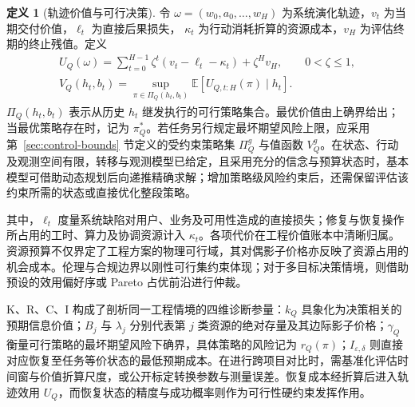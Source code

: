 \documentclass[11pt,a4paper]{ctexart}
\numberwithin{equation}{section}
\theoremstyle{definition}
\newtheorem{definition}{定义}[section]
\theoremstyle{plain}
\begin{document}
\begin{definition}[轨迹价值与可行决策]
令 $\omega=(w_0,a_0,\ldots,w_H)$ 为系统演化轨迹，$v_t$ 为当期交付价值，$\ell_t$ 为直接后果损失，
$\kappa_t$ 为行动消耗折算的资源成本，$v_H$ 为评估终期的终止残值。定义
\begin{align}
U_Q(\omega)=\sum_{t=0}^{H-1}\zeta^t(v_t-\ell_t-\kappa_t)+\zeta^H v_H,
\qquad 0<\zeta\le1, \label{eq:trajectory-value}\\
V_Q(h_t,b_t)=\sup_{\pi\in\Pi_Q(h_t,b_t)}
\mathbb E[U_{Q,t:H}(\pi)\mid h_t]. \label{eq:value-function}
\end{align}
$\Pi_Q(h_t,b_t)$ 表示从历史 $h_t$ 继发执行的可行策略集合。最优价值由上确界给出；当最优策略存在时，记为 $\pi_Q^*$。若任务另行规定最坏期望风险上限，应采用第~\ref{sec:control-bounds} 节定义的受约束策略集 $\Pi_Q^g$ 与值函数 $V_Q^g$。在状态、行动及观测空间有限，转移与观测模型已给定，且采用充分的信念与预算状态时，基本模型可借助动态规划后向递推精确求解；增加策略级风险约束后，还需保留评估该约束所需的状态或直接优化整段策略。
\end{definition}

其中，$\ell_t$ 度量系统缺陷对用户、业务及可用性造成的直接损失；修复与恢复操作所占用的工时、算力及协调资源计入 $\kappa_t$。各项代价在工程价值账本中清晰归属。资源预算不仅界定了工程方案的物理可行域，其对偶影子价格亦反映了资源占用的机会成本。伦理与合规边界以刚性可行集约束体现；对于多目标决策情境，则借助预设的效用偏好序或 Pareto 占优前沿进行仲裁。

K、R、C、I 构成了剖析同一工程情境的四维诊断参量：$k_Q$ 具象化为决策相关的预期信息价值；$B_j$ 与 $\lambda_j$ 分别代表第 $j$ 类资源的绝对存量及其边际影子价格；$\gamma_Q$ 衡量可行策略的最坏期望风险下确界，具体策略的风险记为 $r_Q(\pi)$；$I_{\varepsilon,\delta}$ 则直接对应恢复至任务等价状态的最低预期成本。在进行跨项目对比时，需基准化评估时间窗与价值折算尺度，或公开标定转换参数与测量误差。恢复成本经折算后进入轨迹效用 $U_Q$，而恢复状态的精度与成功概率则作为可行性硬约束发挥作用。
\end{document}
